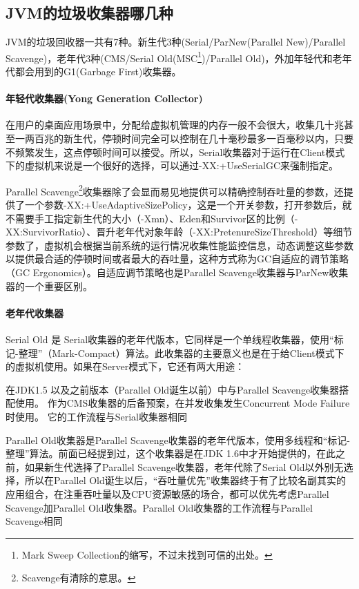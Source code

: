 \documentclass[../../../interview-questions.tex]{subfiles}
\begin{document}
\subsection{JVM的垃圾收集器哪几种}

JVM的垃圾回收器一共有7种。新生代3种(Serial/ParNew(Parallel New)/Parallel Scavenge)，老年代3种(CMS/Serial Old(MSC\footnote{Mark Sweep Collection的缩写，不过未找到可信的出处。})/Parallel Old)，外加年轻代和老年代都会用到的G1(Garbage First)收集器。

\paragraph{年轻代收集器(Yong Generation Collector)}
在用户的桌面应用场景中，分配给虚拟机管理的内存一般不会很大，收集几十兆甚至一两百兆的新生代，停顿时间完全可以控制在几十毫秒最多一百毫秒以内，只要不频繁发生，这点停顿时间可以接受。所以，Serial收集器对于运行在Client模式下的虚拟机来说是一个很好的选择，可以通过-XX:+UseSerialGC来强制指定。

Parallel Scavenge\footnote{Scavenge有清除的意思。}收集器除了会显而易见地提供可以精确控制吞吐量的参数，还提供了一个参数-XX:+UseAdaptiveSizePolicy，这是一个开关参数，打开参数后，就不需要手工指定新生代的大小（-Xmn）、Eden和Survivor区的比例（-XX:SurvivorRatio）、晋升老年代对象年龄（-XX:PretenureSizeThreshold）等细节参数了，虚拟机会根据当前系统的运行情况收集性能监控信息，动态调整这些参数以提供最合适的停顿时间或者最大的吞吐量，这种方式称为GC自适应的调节策略（GC Ergonomics）。自适应调节策略也是Parallel Scavenge收集器与ParNew收集器的一个重要区别。

\paragraph{老年代收集器}
Serial Old 是 Serial收集器的老年代版本，它同样是一个单线程收集器，使用“标记-整理”（Mark-Compact）算法。此收集器的主要意义也是在于给Client模式下的虚拟机使用。如果在Server模式下，它还有两大用途：

在JDK1.5 以及之前版本（Parallel Old诞生以前）中与Parallel Scavenge收集器搭配使用。
作为CMS收集器的后备预案，在并发收集发生Concurrent Mode Failure时使用。
它的工作流程与Serial收集器相同

Parallel Old收集器是Parallel Scavenge收集器的老年代版本，使用多线程和“标记-整理”算法。前面已经提到过，这个收集器是在JDK 1.6中才开始提供的，在此之前，如果新生代选择了Parallel Scavenge收集器，老年代除了Serial Old以外别无选择，所以在Parallel Old诞生以后，“吞吐量优先”收集器终于有了比较名副其实的应用组合，在注重吞吐量以及CPU资源敏感的场合，都可以优先考虑Parallel Scavenge加Parallel Old收集器。Parallel Old收集器的工作流程与Parallel Scavenge相同
\end{document}

